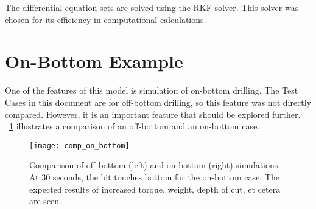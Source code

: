 \begin{mathwhere}[0.4in]
\end{mathwhere}
The differential equation sets are solved using the RKF solver. This solver was chosen for its efficiency in computational calculations.


\section{On-Bottom Example}
One of the features of this model is simulation of on-bottom drilling.  The Test Cases in this document are for off-bottom drilling, so this feature was not directly compared.  However, it is an important feature that should be explored further. \figurename~\ref{findings} illustrates a comparison of an off-bottom and an on-bottom case.
\begin{figure}
  \centering
  \texttt{[image: comp\_on\_bottom]}
  \caption[Comparison of off-bottom and on-bottom simulations]{Comparison of off-bottom (left) and on-bottom (right) simulations.  At 30 seconds, the bit touches bottom for the on-bottom case.  The expected results of increased torque, weight, depth of cut, et cetera are seen.}\label{findings}
\end{figure} 